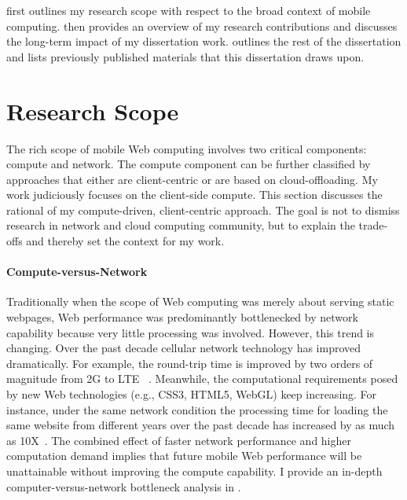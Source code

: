  first outlines my research scope with respect to the broad context of mobile computing.  then provides an overview of my research contributions and  discusses the long-term impact of my dissertation work.  outlines the rest of the dissertation and  lists previously published materials that this dissertation draws upon.

\section{Research Scope}
\label{sec:intro:scope}

The rich scope of mobile Web computing involves two critical components: compute and network. The compute component can be further classified by approaches that either are client-centric or are based on cloud-offloading. My work judiciously focuses on the client-side compute. This section discusses the rational of my compute-driven, client-centric approach. The goal is not to dismiss research in network and cloud computing community, but to explain the trade-offs and thereby set the context for my work.

\paragraph{Compute-versus-Network} Traditionally when the scope of Web computing was merely about serving static webpages, Web performance was predominantly bottlenecked by network capability because very little processing was involved. However, this trend is changing. Over the past decade cellular network technology has improved dramatically. For example, the round-trip time is improved by two orders of magnitude from 2G to LTE ~\cite{4gtest}. Meanwhile, the computational requirements posed by new Web technologies (e.g., CSS3, HTML5, WebGL) keep increasing. For instance, under the same network condition the processing time for loading the same website from different years over the past decade has increased by as much as 10X~\cite{big-little}. The combined effect of faster network performance and higher computation demand implies that future mobile Web performance will be unattainable without improving the compute capability. I provide an in-depth computer-versus-network bottleneck analysis in .

